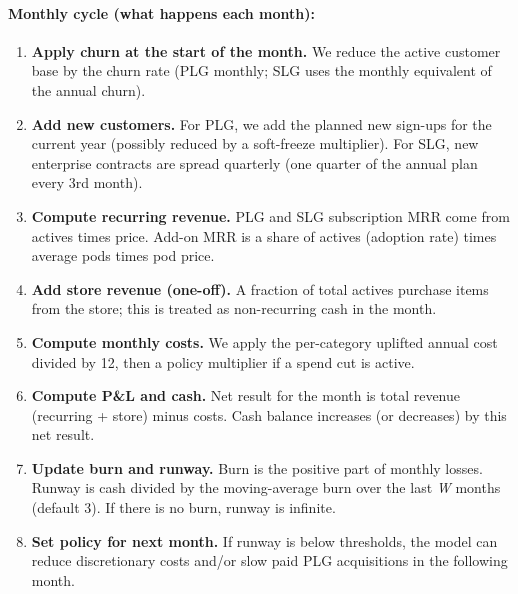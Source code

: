 \documentclass[11pt, a4paper, oneside]{article}
\begin{document}
\paragraph{Monthly cycle (what happens each month):}
\begin{enumerate}
\item \textbf{Apply churn at the start of the month.} We reduce the active customer base by the churn rate (PLG monthly; SLG uses the monthly equivalent of the annual churn).
\item \textbf{Add new customers.} For PLG, we add the planned new sign-ups for the current year (possibly reduced by a soft-freeze multiplier). For SLG, new enterprise contracts are spread quarterly (one quarter of the annual plan every 3rd month).
\item \textbf{Compute recurring revenue.} PLG and SLG subscription MRR come from actives times price. Add-on MRR is a share of actives (adoption rate) times average pods times pod price.
\item \textbf{Add store revenue (one-off).} A fraction of total actives purchase items from the store; this is treated as non-recurring cash in the month.
\item \textbf{Compute monthly costs.} We apply the per-category uplifted annual cost divided by 12, then a policy multiplier if a spend cut is active.
\item \textbf{Compute P\&L and cash.} Net result for the month is total revenue (recurring + store) minus costs. Cash balance increases (or decreases) by this net result.
\item \textbf{Update burn and runway.} Burn is the positive part of monthly losses. Runway is cash divided by the moving-average burn over the last \emph{W} months (default 3). If there is no burn, runway is infinite.
\item \textbf{Set policy for next month.} If runway is below thresholds, the model can reduce discretionary costs and/or slow paid PLG acquisitions in the following month.
\end{enumerate}

\end{document}
